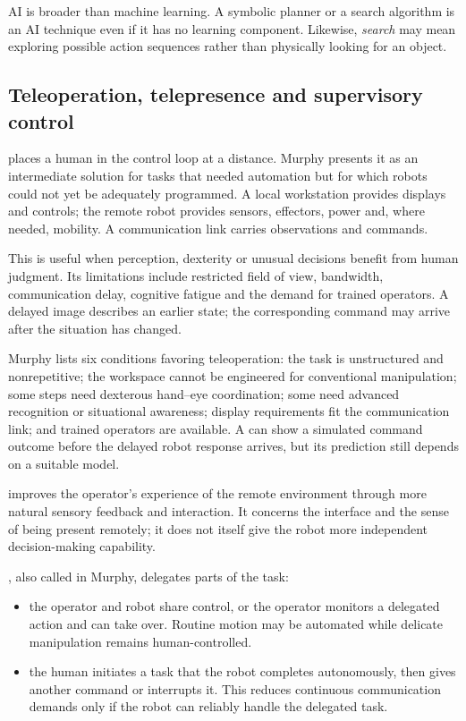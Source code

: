 AI is broader than machine learning. A symbolic planner or a search algorithm is an AI technique even if it has no learning component. Likewise, \emph{search} may mean exploring possible action sequences rather than physically looking for an object.

\subsection{Teleoperation, telepresence and supervisory control}
 places a human in the control loop at a distance. Murphy presents it as an intermediate solution for tasks that needed automation but for which robots could not yet be adequately programmed. A local workstation provides displays and controls; the remote robot provides sensors, effectors, power and, where needed, mobility. A communication link carries observations and commands.

This is useful when perception, dexterity or unusual decisions benefit from human judgment. Its limitations include restricted field of view, bandwidth, communication delay, cognitive fatigue and the demand for trained operators. A delayed image describes an earlier state; the corresponding command may arrive after the situation has changed.

Murphy lists six conditions favoring teleoperation: the task is unstructured and nonrepetitive; the workspace cannot be engineered for conventional manipulation; some steps need dexterous hand--eye coordination; some need advanced recognition or situational awareness; display requirements fit the communication link; and trained operators are available. A  can show a simulated command outcome before the delayed robot response arrives, but its prediction still depends on a suitable model.

 improves the operator's experience of the remote environment through more natural sensory feedback and interaction. It concerns the interface and the sense of being present remotely; it does not itself give the robot more independent decision-making capability.

, also called  in Murphy, delegates parts of the task:
\begin{itemize}
\item {} the operator and robot share control, or the operator monitors a delegated action and can take over. Routine motion may be automated while delicate manipulation remains human-controlled.
\item {} the human initiates a task that the robot completes autonomously, then gives another command or interrupts it. This reduces continuous communication demands only if the robot can reliably handle the delegated task.
\end{itemize}
